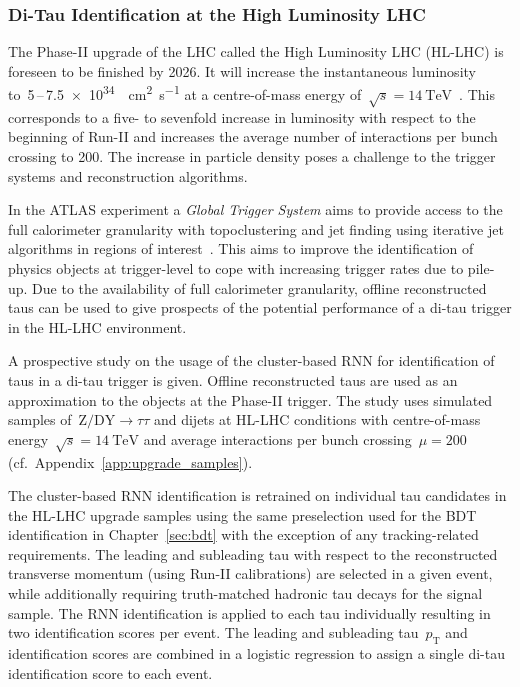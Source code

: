 \subsubsection{Di-Tau Identification at the High Luminosity LHC}
\label{sec:hlt_rate_reduction}

The Phase-II upgrade of the LHC called the High Luminosity LHC (HL-LHC) is
foreseen to be finished by 2026. It will increase the instantaneous luminosity
to~\num{5}\,--\,\SI{7.5e34}{\per\square\centi\metre\per\second} at a
centre-of-mass energy
of~$\sqrt{s} = \SI{14}{\TeV}$~\cite{hl_lhc_prelim_design_report}. This
corresponds to a five- to sevenfold increase in luminosity with respect to the
beginning of Run-II and increases the average number of interactions per bunch
crossing to \num{200}. The increase in particle density poses a challenge to the
trigger systems and reconstruction algorithms.

In the ATLAS experiment a \emph{Global Trigger System} aims to provide access to
the full calorimeter granularity with topoclustering and jet finding using
iterative jet algorithms in regions of interest~\cite{phase_2_scoping}. This
aims to improve the identification of physics objects at trigger-level to cope
with increasing trigger rates due to pile-up. Due to the availability of full
calorimeter granularity, offline reconstructed taus can be used to give
prospects of the potential performance of a di-tau trigger in the HL-LHC
environment.

A prospective study on the usage of the cluster-based RNN for identification of
taus in a di-tau trigger is given. Offline reconstructed taus are used as an
approximation to the objects at the Phase-II trigger. The study uses simulated
samples of~$\text{Z} / \text{DY} \to \tau \tau$ and dijets at HL-LHC conditions
with centre-of-mass energy~$\sqrt{s}=\SI{14}{\TeV}$ and average interactions per
bunch crossing~$\mu = 200$ (cf.\ Appendix~\ref{app:upgrade_samples}).

The cluster-based RNN identification is retrained on individual tau candidates
in the HL-LHC upgrade samples using the same preselection used for the BDT
identification in Chapter~\ref{sec:bdt} with the exception of any
tracking-related requirements. The leading and subleading tau with respect to
the reconstructed transverse momentum (using Run-II calibrations) are selected
in a given event, while additionally requiring truth-matched hadronic tau decays
for the signal sample. The RNN identification is applied to each tau
individually resulting in two identification scores per event. The leading and
subleading tau~$p_\text{T}$ and identification scores are combined in a logistic
regression to assign a single di-tau identification score to each event.

